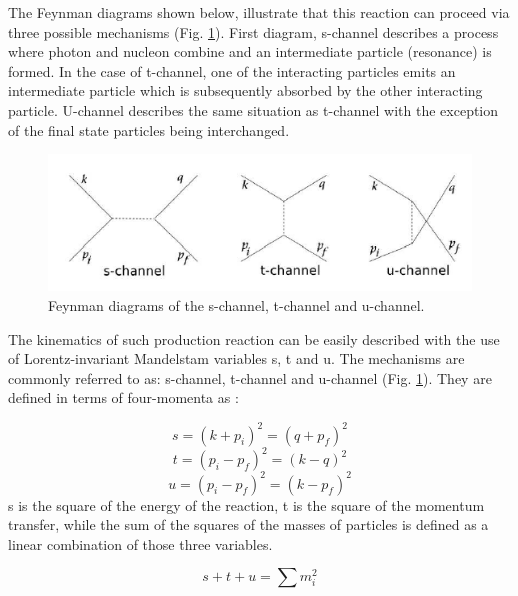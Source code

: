 \indent The Feynman diagrams shown below, illustrate that this reaction can proceed via three possible mechanisms (Fig. \ref{mandelstam}). First diagram, s-channel describes a process where photon and nucleon combine and an intermediate particle (resonance) is formed. In the case of t-channel, one of the interacting particles emits an intermediate particle which is subsequently absorbed by the other interacting particle. U-channel describes the same situation as t-channel with the exception of the final state particles being interchanged.

\begin{figure}[H]
\begin{center}
\includegraphics[scale=0.6]{pictures/png/mandelstam.png}
\caption{Feynman diagrams of the s-channel, t-channel and u-channel.}
\label{mandelstam}
\end{center}
\end{figure}

\indent The kinematics of such production reaction can be easily described with the use of Lorentz-invariant Mandelstam variables s, t and u. The mechanisms are commonly referred to as: s-channel, t-channel and u-channel (Fig. \ref{mandelstam}). They are defined in terms of four-momenta as \cite{walker}:

\begin{equation}
s=(k+p_{i})^{2}=(q+p_{f})^{2}
\end{equation}
\begin{equation}
t=(p_{i}-p_{f})^{2}=(k-q)^{2}
\end{equation}
\begin{equation}
u=(p_{i}-p_{f})^{2}=(k-p_{f})^{2}
\end{equation}
s is the square of the energy of the reaction, t is the square of the momentum transfer, while the sum of the squares of the masses of particles is defined as a linear combination of those three variables.

\begin{equation}
s+t+u=\sum\limits m^{2}_{i}
\end{equation}

